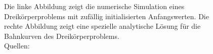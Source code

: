 \begin{figure}[h]
\begin{subfigure}{0.49\textwidth}
      \end{subfigure}
      \caption{Die linke Abbildung zeigt die numerische Simulation eines Dreikörperproblems mit zufällig initialisierten Anfangswerten. Die rechte Abbildung zeigt eine spezielle analytische Lösung für die Bahnkurven des Dreikörperproblems. \\ Quellen: \\ \urldreikoerper \\ \urlmotte}
      \label{fig:dreikoerper}
    \end{figure}



